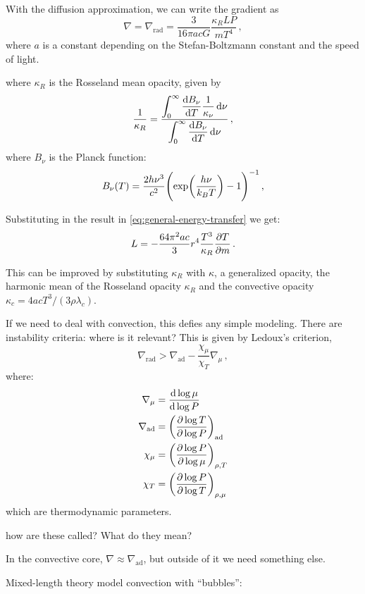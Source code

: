 \documentclass[main.tex]{subfiles}
\begin{document}
With the diffusion approximation, we can write the gradient as
%
\begin{equation} \label{eq:diffusion-approx-gradient}
    \nabla = \nabla_{\text{rad}} = \frac{3}{16 \pi a c G} \frac{\kappa_R L P}{mT^4} \,,
\end{equation}
%
where \(a\) is a constant depending on the Stefan-Boltzmann constant and the speed of light.

%
where \(\kappa_R\) is the Rosseland mean opacity, given by
%
\begin{equation}
  \frac{1}{\kappa_{R}} =
  \frac{ \displaystyle\int _{0}   ^{\infty}  \dv{B_\nu}{T} \frac{1}{\kappa_\nu} \dd{\nu}}
  {  \displaystyle \int _{0}   ^{\infty} \dv{B_\nu}{T} \dd{\nu}}\,,
\end{equation}
%
where \(B_{\nu }\) is the Planck function: 
%
\begin{align}
B_{\nu } (T) = \frac{2 h \nu^3}{ c^2} \qty(\exp(\frac{h \nu }{k_B T}) - 1)^{-1}
\,,
\end{align}
%


Substituting in the result in \eqref{eq:general-energy-transfer} we get:
%
\begin{equation}
    L = - \frac{64 \pi^2 a c }{3} r^4 \frac{T^3}{\kappa_R} \pdv{T}{m}
\,.
\end{equation}

This can be improved by substituting \(\kappa_{R}   \) with \(\kappa\), a generalized opacity, the harmonic mean of the Rosseland opacity \(\kappa _R \) and the convective opacity \(\kappa_c = 4acT^3 / (3 \rho \lambda_c )\).


If we need to deal with convection, this defies any simple modeling. There are instability criteria: where is it relevant? This is given by
Ledoux's criterion,
%
\begin{equation}
    \nabla_{\text{rad}} > \nabla_{\text{ad}} - \frac{\chi_\mu}{\chi_T} \nabla_\mu\,,
\end{equation}
%
where:
%
\begin{subequations}
\begin{align}
  \nabla_\mu  &= \dv{\log \mu }{\log P} \\
  \nabla_{\text{ad}}  &= \qty(\pdv{\log T }{\log P} )_{\text{ad}} \\
  \chi_{\mu}  &= \qty(\pdv{\log P }{\log \mu} )_{\rho, T} \\
  \chi_{T}  &= \qty(\pdv{\log P }{\log T} )_{\rho, \mu}
\end{align}
\end{subequations}
%
which are thermodynamic parameters.

\begin{greenbox}
  how are these called? What do they mean?
\end{greenbox}

In the convective core, \(\nabla \approx \nabla_{\text{ad}}\), but outside of it we need something else.

Mixed-length theory model convection with ``bubbles'':
\end{document}
